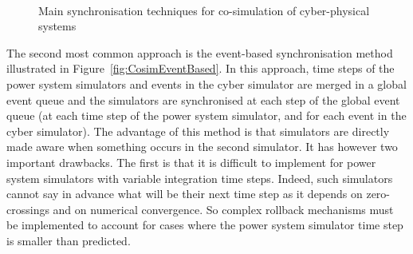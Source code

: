 \begin{figure}
\centering
{} \\ \vspace*{0.5cm} %
{}
\caption{Main synchronisation techniques for co-simulation of cyber-physical systems~\cite{CosimFigure}}
\label{fig:Cosim}
\end{figure}

The second most common approach is the event-based synchronisation method illustrated in Figure~\ref{fig:CosimEventBased}. In this approach, time steps of the power system simulators and events in the cyber simulator are merged in a global event queue and the simulators are synchronised at each step of the global event queue (\ie at each time step of the power system simulator, and for each event in the cyber simulator). The advantage of this method is that simulators are directly made aware when something occurs in the second simulator. It has however two important drawbacks. The first is that it is difficult to implement for power system simulators with variable integration time steps. Indeed, such simulators cannot say in advance what will be their next time step as it depends on zero-crossings and on numerical convergence. So complex rollback mechanisms must be implemented to account for cases where the power system simulator time step is smaller than predicted.

